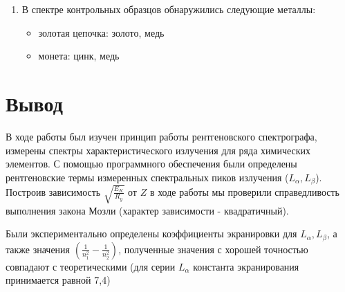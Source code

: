 \documentclass[a4paper]{article}
\begin{document}
\begin{enumerate}
\item В спектре контрольных образцов обнаружились следующие металлы:
\begin{itemize}
    \item золотая цепочка: золото, медь
    \item монета: цинк, медь
\end{itemize}

\end{enumerate}

\section{Вывод}

В ходе работы был изучен принцип работы рентгеновского спектрографа, измерены спектры характеристического излучения для ряда химических элементов. С помощью программного обеспечения были определены рентгеновские термы измеренных спектральных пиков излучения ($L_{\alpha}, L_{\beta}$). Построив зависимость $\sqrt{\frac{E_K}{R_y}}$ от $Z$ в ходе работы мы проверили справедливость выполнения закона Мозли (характер зависимости - квадратичный). \par
Были экспериментально определены коэффициенты экранировки для $L_{\alpha}, L_{\beta}$, а также значения $(\frac{1}{n_1^2}-\frac{1}{n_2^2})$, полученные значения с хорошей точностью совпадают с теоретическими (для серии $L_{\alpha}$ константа экранирования принимается равной 7,4)
\end{document}

